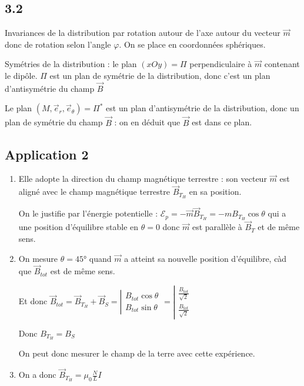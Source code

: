 \documentclass[a4paper,12pt]{book}
\begin{document}
\subsection{3.2}
Invariances de la distribution par rotation autour de l'axe autour du vecteur $\vec{m}$ donc de rotation selon l'angle $\varphi$. On se place en coordonnées sphériques.
\par Symétries de la distribution : le plan $(xOy)=\Pi$ perpendiculaire à $\vec{m}$ contenant le dipôle. $\Pi$ est un plan de symétrie de la distribution, donc c'est un plan d'antisymétrie du champ $\vec{B}$
\par Le plan $(M, \vec{e}_r, \vec{e}_\theta)=\Pi^*$ est un plan d'antisymétrie de la distribution, donc un plan de symétrie du champ $\vec{B}$ : on en déduit que $\vec{B}$ est dans ce plan.

\subsection{Application 2}
\begin{enumerate}
\item Elle adopte la direction du champ magnétique terrestre : son vecteur $\vec{m}$ est aligné avec le champ magnétique terrestre $\vec{B}_{T_H}$ en sa position.\par On le justifie par l'énergie potentielle : $\mathcal{E}_p = -\vec{m}\vec{B}_{T_H} = -mB_{T_H}\cos\theta$ qui a une position d'équilibre stable en $\theta=0$ donc $\vec{m}$ est parallèle à $\vec{B}_T$ et de même sens.
\item On mesure $\theta=45$° quand $\vec{m}$ a atteint sa nouvelle position d'équilibre, càd que $\vec{B}_{tot}$ est de même sens. \par Et donc $\vec{B}_{tot} = \vec{B}_{T_H} +\vec{B}_S = \left|\begin{matrix} B_{tot}\cos\theta \\ B_{tot}\sin\theta\end{matrix}\right. = \left|\begin{matrix}\frac{B_{tot}}{\sqrt{2}} \\ \frac{B_{tot}}{\sqrt{2}}\end{matrix}\right.$ \par Donc $B_{T_H}=B_S$
\par On peut donc mesurer le champ de la terre avec cette expérience. 
\item On a donc $\vec{B}_{T_H} = \mu_0\frac{N}{L}I$
\end{enumerate}
\end{document}
